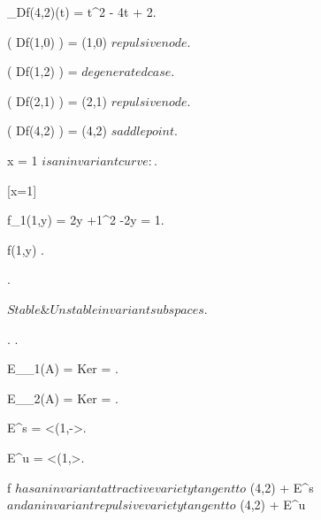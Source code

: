 \documentclass[../Main/main]{subfiles}
\begin{document}
{{{			\chi_{Df(4,2)}(t) = t^2 - 4t + 2.

			\sigma( Df(1,0) ) =  \imp (1,0) $ repulsive node $.

			\sigma( Df(1,2) ) =  $ degenerated case $.

			\sigma( Df(2,1) ) =  \imp (2,1) $ repulsive node $.

			\sigma( Df(4,2) ) =  \imp (4,2) $ saddle point $.

			x = 1 $is an invariant curve:$.

			[x=1]
			{
				f_1(1,y) = 2y +1^2 -2y = 1.

				f(1,y) \in \set{ (x,y) \in \R^2 \with x = 1 }.
			}.

			$Stable \& Unstable invariant subspaces $.

			.
			.

			E_{\lambda_1}(A) = Ker  = .

			E_{\lambda_2}(A) = Ker  = .

			E^s = <(1,->.

			E^u = <(1,>.

			f $ has an invariant attractive variety tangent to $ (4,2) + E^s $ and an invariant repulsive variety tangent to $ (4,2) + E^u 
		}
	}
	
	
	
}
\end{document}
